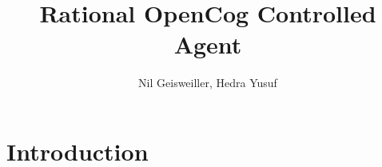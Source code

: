 \documentclass[aspectratio=169]{beamer}
\title{Rational OpenCog Controlled Agent}
\author{Nil Geisweiller, Hedra Yusuf}
\institute[SingularityNET OpenCog Foundations]
{
  \begin{center}
    AGI-23\\
    \texttt{[image: pictures/snet\_oc.png]}
  \end{center}
}
\date[AGI-23]
\begin{document}
\section{Introduction}

\begin{frame}
  \maketitle
\end{frame}









\end{document}
